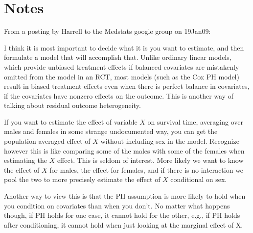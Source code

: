 \section{Notes}
From a posting by Harrell to the Medstats google group on 19Jan09:
{\small
I think it is most important to decide what it is you want to
estimate, and then formulate a model that will accomplish that.
Unlike ordinary linear models, which provide unbiased treatment
effects if balanced covariates are mistakenly omitted from the model
in an RCT, most models (such as the Cox PH model) result in biased
treatment effects even when there is perfect balance in covariates, if
the covariates have nonzero effects on the outcome.  This is another
way of talking about residual outcome heterogeneity.

If you want to estimate the effect of variable $X$ on survival time,
averaging over males and females in some strange undocumented way, you
can get the population averaged effect of $X$ without including sex in
the model.  Recognize however this is like comparing some of the males
with some of the females when estimating the $X$ effect.  This is seldom
of interest.  More likely we want to know the effect of $X$ for males,
the effect for females, and if there is no interaction we pool the two
to more precisely estimate the effect of $X$ conditional on sex.

Another way to view this is that the PH assumption is more likely to
hold when you condition on covariates than when you don't.  No matter
what happens though, if PH holds for one case, it cannot hold for the
other, e.g., if PH holds after conditioning, it cannot hold when just
looking at the marginal effect of X.
}

\def\apacue{0}
